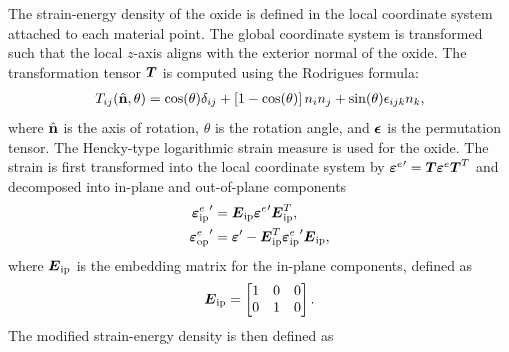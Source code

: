 The strain-energy density of the oxide is defined in the local coordinate system attached to each material point. The global coordinate system is transformed such that the local $z$-axis aligns with the exterior normal of the oxide. The transformation tensor $\boldsymbol{T}$ is computed using the Rodrigues formula:
\begin{align}
  T_{ij}(\hat{\textbf{n}}, \theta) = \cos(\theta)\delta_{ij} + \left[ 1-\cos(\theta) \right] n_in_j + \sin(\theta)\epsilon_{ijk}n_k,
\end{align}
where $\hat{\textbf{n}}$ is the axis of rotation, $\theta$ is the rotation angle, and $\boldsymbol{\epsilon}$ is the permutation tensor. The Hencky-type logarithmic strain measure is used for the oxide. The strain is first transformed into the local coordinate system by ${\boldsymbol{\varepsilon}^e}' = \boldsymbol{T} {\boldsymbol{\varepsilon}^e} \boldsymbol{T}^T$ and decomposed into in-plane and out-of-plane components
\begin{subequations}
  \begin{align}
    {\boldsymbol{\varepsilon}^e_\text{ip}}' & = \boldsymbol{E}_\text{ip} {\boldsymbol{\varepsilon}^e}' \boldsymbol{E}_\text{ip}^T,                      \\
    {\boldsymbol{\varepsilon}^e_\text{op}}' & = \boldsymbol{\varepsilon}' - \boldsymbol{E}_\text{ip}^T {\boldsymbol{\varepsilon}^e_\text{ip}}' \boldsymbol{E}_\text{ip}, 
  \end{align}
\end{subequations}
where $\boldsymbol{E}_\text{ip}$ is the embedding matrix for the in-plane components, defined as
\begin{align}
  \boldsymbol{E}_\text{ip} =
  \begin{bmatrix}
    1 & 0 & 0 \\
    0 & 1 & 0 
  \end{bmatrix}.
\end{align}
The modified strain-energy density is then defined as

